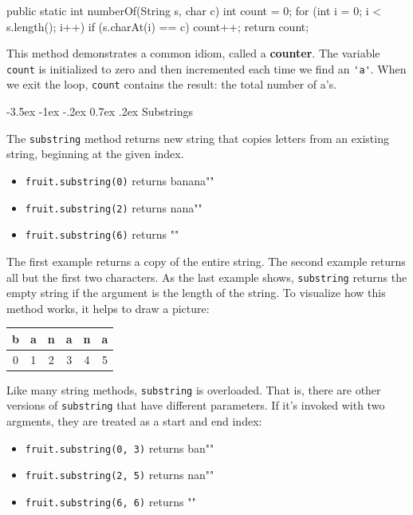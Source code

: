 \documentclass[12pt]{book}
\makeatletter
\theoremstyle{exercise}
\newcommand{\java}[1]{\verb"#1"}
\renewcommand{\section}{\@startsection {section}{1}{\z@}%
    {-3.5ex \@plus -1ex \@minus -.2ex}%
    {0.7ex \@plus.2ex}%
    {\normalfont\Large\bfseries}}
\newcommand{\java}[1]{\lstinline{#1}} %
\makeatother
\begin{document}
\begin{code}
    public static int numberOf(String s, char c) {
        int count = 0;
        for (int i = 0; i < s.length(); i++) {
            if (s.charAt(i) == c) {
                count++;
            }
        }
        return count;
    }
\end{code}


This method demonstrates a common idiom, called a {\bf counter}.
The variable \java{count} is initialized to zero and then incremented each time we find an \java{'a'}.
When we exit the loop, \java{count} contains the result: the total number of a's.


\section{Substrings}

The \java{substring} method returns new string that copies letters from an existing string, beginning at the given index.

\begin{itemize}
\item \java{fruit.substring(0)} returns \java{"banana"}
\item \java{fruit.substring(2)} returns \java{"nana"}
\item \java{fruit.substring(6)} returns \java{""}
\end{itemize}

The first example returns a copy of the entire string.
The second example returns all but the first two characters.
As the last example shows, \java{substring} returns the empty string if the argument is the length of the string.
To visualize how this method works, it helps to draw a picture:

\begin{center}
\begin{tabular}{|c|c|c|c|c|c|}
\hline
b & a & n & a & n & a \\
\hline
0 & 1 & 2 & 3 & 4 & 5 \\
\hline
\end{tabular}
\end{center}

Like many string methods, \java{substring} is overloaded.
That is, there are other versions of \java{substring} that have different parameters.
If it's invoked with two argments, they are treated as a start and end index:

\begin{itemize}
\item \java{fruit.substring(0, 3)} returns \java{"ban"}
\item \java{fruit.substring(2, 5)} returns \java{"nan"}
\item \java{fruit.substring(6, 6)} returns \java{""}
\end{itemize}
\end{document}
